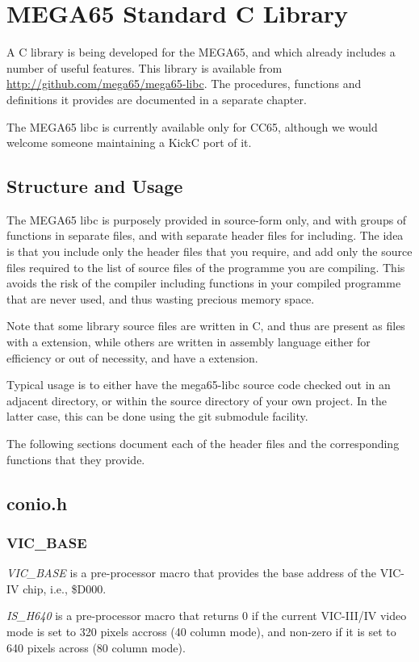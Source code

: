 \chapter{MEGA65 Standard C Library}

A C library is being developed for the MEGA65, and which already
includes a number of useful features. This library is available from
\url{http://github.com/mega65/mega65-libc}. The procedures,
functions and definitions it provides are documented in a separate
chapter.

The MEGA65 libc is currently available only for CC65, although we would
welcome someone maintaining a KickC port of it.

\section{Structure and Usage}

The MEGA65 libc is purposely provided in source-form only, and with groups
of functions in separate files, and with separate header files for including.
The idea is that you include only the header files that you require, and
add only the source files required to the list of source files of the programme
you are compiling.  This avoids the risk of the compiler including functions
in your compiled programme that are never used, and thus wasting precious memory
space.

Note that some library source files are written in C, and thus are present as
files with a  extension, while others are written in assembly language
either for efficiency or out of necessity, and have a  extension.

Typical usage is to either have the mega65-libc source code checked out in an
adjacent directory, or within the source directory of your own project.  In the
latter case, this can be done using the git submodule facility.

The following sections document each of the header files and the corresponding
functions that they provide.

\section{conio.h}



\subsection{VIC\_BASE}

{\em VIC\_BASE} is a pre-processor macro that provides the base address of the
VIC-IV chip, i.e., \$D000.

{\em IS\_H640} is a pre-processor macro that returns 0 if the current VIC-III/IV
video mode is set to 320 pixels accross (40 column mode), and non-zero if it is set to 640 pixels across (80 column mode).
